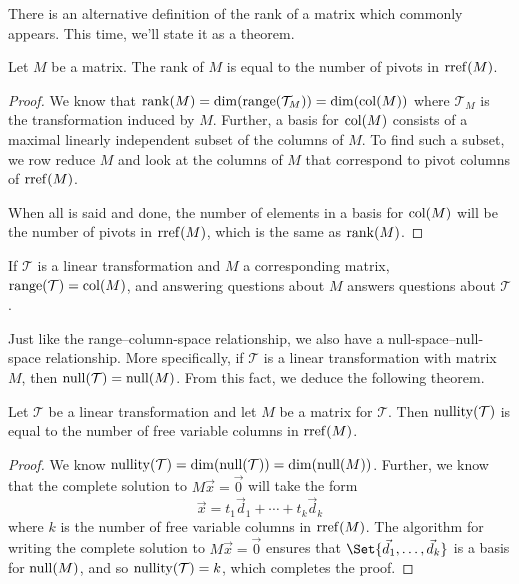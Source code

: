 There is an alternative definition of the rank of a matrix which commonly appears. This time,
we'll state it as a theorem.

\begin{theorem}
	Let $M$ be a matrix. The rank of $M$ is equal to the number
	of pivots in $\operatorname{rref}(M)$.
\end{theorem}
\begin{proof}
	We know that $\operatorname{rank}(M)=\operatorname{dim}(\operatorname{range}(\mathcal T_M))=\operatorname{dim}(\operatorname{col}(M))$ where $\mathcal T_M$ is the transformation
	induced by $M$. Further, a basis for $\operatorname{col}(M)$ consists of a maximal linearly independent subset
	of the columns of $M$. To find such a subset, we row reduce $M$ and look at the columns of $M$ that correspond
	to pivot columns of $\operatorname{rref}(M)$.

	When all is said and done, the number of elements in a basis for $\operatorname{col}(M)$ will be the number of pivots in $\operatorname{rref}(M)$,
	which is the same as $\operatorname{rank}(M)$.
\end{proof}

\begin{emphbox}[Takeaway]
	If $\mathcal T$ is a linear transformation and $M$ a corresponding
	matrix, $\operatorname{range}(\mathcal T)=\operatorname{col}(M)$, and answering questions about $M$ answers
	questions about $\mathcal T$.
\end{emphbox}

Just like the range--column-space relationship, we also have a null-space--null-space relationship.
More specifically, if $\mathcal T$ is a linear transformation with matrix $M$, then
$\operatorname{null}(\mathcal T)=\operatorname{null}(M)$. From this fact, we deduce the following theorem.

\begin{theorem}
	Let $\mathcal T$ be a linear transformation and let $M$ be a matrix for $\mathcal T$. Then
	$\operatorname{nullity}(\mathcal T)$ is equal to the number of free variable columns in $\operatorname{rref}(M)$.
\end{theorem}
\begin{proof}
	We know $\operatorname{nullity}(\mathcal T)=\operatorname{dim}(\operatorname{null}(\mathcal T))=\operatorname{dim}(\operatorname{null}(M))$. Further, we know
	that the complete solution to $M\vec x=\vec 0$ will take the form
	\[
		\vec x=t_1\vec d_1+\cdots +t_k\vec d_k
	\]
	where $k$ is the number of free variable columns in $\operatorname{rref}(M)$. The algorithm for
	writing the complete solution to $M\vec x=\vec 0$ ensures that $\Set{\vec d_1,\ldots,\vec d_k}$
	is a basis for $\operatorname{null}(M)$, and so $\operatorname{nullity}(\mathcal T)=k$, which completes the proof.
\end{proof}


